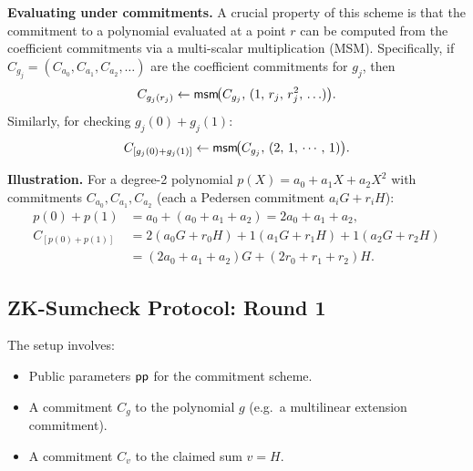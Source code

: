 \documentclass[11pt]{article}
\begin{document}
\medskip
\noindent\textbf{Evaluating under commitments.}  A crucial property of
this scheme is that the commitment to a polynomial evaluated at a
point $r$ can be computed from the coefficient commitments via a
multi-scalar multiplication (MSM).  Specifically, if
$C_{g_j} = (C_{a_0}, C_{a_1}, C_{a_2}, \ldots)$ are the coefficient
commitments for $g_j$, then
\[
  C_{g_j(r_j)} \leftarrow \mathsf{msm}\!\bigl(C_{g_j},\, (1,\, r_j,\, r_j^2,\, \ldots)\bigr).
\]
Similarly, for checking $g_j(0) + g_j(1)$:
\[
  C_{[g_j(0)+g_j(1)]} \leftarrow \mathsf{msm}\!\bigl(C_{g_j},\, (2,\, 1,\, \cdots,\, 1)\bigr).
\]

\noindent\textbf{Illustration.}  For a degree-2 polynomial
$p(X) = a_0 + a_1 X + a_2 X^2$ with commitments
$C_{a_0}, C_{a_1}, C_{a_2}$ (each a Pedersen commitment
$a_i G + r_i H$):
\begin{align*}
  p(0) + p(1) &= a_0 + (a_0 + a_1 + a_2) = 2a_0 + a_1 + a_2,\\
  C_{[p(0)+p(1)]} &= 2(a_0 G + r_0 H) + 1(a_1 G + r_1 H) + 1(a_2 G + r_2 H)\\
                  &= (2a_0 + a_1 + a_2)G + (2r_0 + r_1 + r_2)H.
\end{align*}

\subsection{ZK-Sumcheck Protocol: Round 1}

\noindent The setup involves:
\begin{itemize}
  \item Public parameters $\mathsf{pp}$ for the commitment scheme.
  \item A commitment $C_g$ to the polynomial $g$ (e.g.\ a
        multilinear extension commitment).
  \item A commitment $C_v$ to the claimed sum $v = H$.
\end{itemize}
\end{document}
